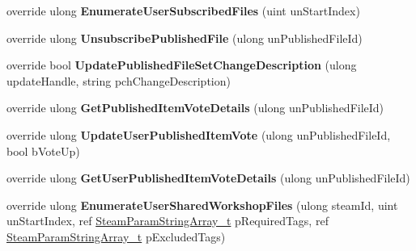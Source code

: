 \begin{DoxyCompactItemize}
\item 
\mbox{\label{class_valve_1_1_steamworks_1_1_c_steam_remote_storage_a7f1a53140a28e1493b414ae2287bec71}} 
override ulong {\bfseries Enumerate\+User\+Subscribed\+Files} (uint un\+Start\+Index)
\item 
\mbox{\label{class_valve_1_1_steamworks_1_1_c_steam_remote_storage_a8b8ec8f887dea8652bda0958d63f7b6f}} 
override ulong {\bfseries Unsubscribe\+Published\+File} (ulong un\+Published\+File\+Id)
\item 
\mbox{\label{class_valve_1_1_steamworks_1_1_c_steam_remote_storage_ae4bd629c5a870e4a826bdb9862b59912}} 
override bool {\bfseries Update\+Published\+File\+Set\+Change\+Description} (ulong update\+Handle, string pch\+Change\+Description)
\item 
\mbox{\label{class_valve_1_1_steamworks_1_1_c_steam_remote_storage_a47eccf40a25766a33c34001400cb8da9}} 
override ulong {\bfseries Get\+Published\+Item\+Vote\+Details} (ulong un\+Published\+File\+Id)
\item 
\mbox{\label{class_valve_1_1_steamworks_1_1_c_steam_remote_storage_a9cd3cfc5d5baf197f088e3c973480b39}} 
override ulong {\bfseries Update\+User\+Published\+Item\+Vote} (ulong un\+Published\+File\+Id, bool b\+Vote\+Up)
\item 
\mbox{\label{class_valve_1_1_steamworks_1_1_c_steam_remote_storage_aa5ae9a3ca943db7ec46491ec7c98fdbd}} 
override ulong {\bfseries Get\+User\+Published\+Item\+Vote\+Details} (ulong un\+Published\+File\+Id)
\item 
\mbox{\label{class_valve_1_1_steamworks_1_1_c_steam_remote_storage_ae01f2db61c13b68ab3d63d1aa7830f87}} 
override ulong {\bfseries Enumerate\+User\+Shared\+Workshop\+Files} (ulong steam\+Id, uint un\+Start\+Index, ref \hyperlink{struct_valve_1_1_steamworks_1_1_steam_param_string_array__t}{Steam\+Param\+String\+Array\+\_\+t} p\+Required\+Tags, ref \hyperlink{struct_valve_1_1_steamworks_1_1_steam_param_string_array__t}{Steam\+Param\+String\+Array\+\_\+t} p\+Excluded\+Tags)

\end{DoxyCompactItemize}
